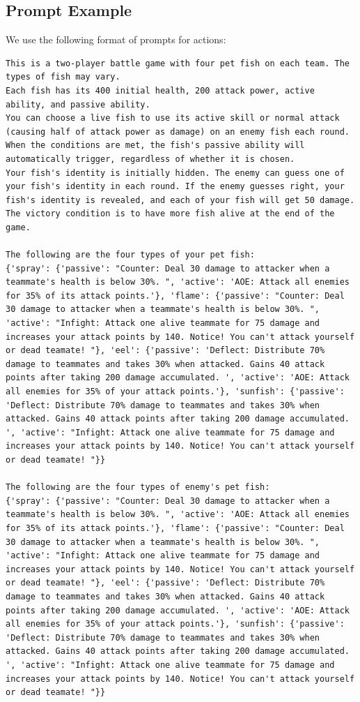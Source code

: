 \subsection{Prompt Example}
We use the following format of prompts for actions:
\begin{lstlisting}
This is a two-player battle game with four pet fish on each team. The types of fish may vary.
Each fish has its 400 initial health, 200 attack power, active ability, and passive ability.
You can choose a live fish to use its active skill or normal attack (causing half of attack power as damage) on an enemy fish each round.
When the conditions are met, the fish's passive ability will automatically trigger, regardless of whether it is chosen.
Your fish's identity is initially hidden. The enemy can guess one of your fish's identity in each round. If the enemy guesses right, your fish's identity is revealed, and each of your fish will get 50 damage.
The victory condition is to have more fish alive at the end of the game.

The following are the four types of your pet fish:
{'spray': {'passive': "Counter: Deal 30 damage to attacker when a teammate's health is below 30%. ", 'active': 'AOE: Attack all enemies for 35% of its attack points.'}, 'flame': {'passive': "Counter: Deal 30 damage to attacker when a teammate's health is below 30%. ", 'active': "Infight: Attack one alive teammate for 75 damage and increases your attack points by 140. Notice! You can't attack yourself or dead teamate! "}, 'eel': {'passive': 'Deflect: Distribute 70% damage to teammates and takes 30% when attacked. Gains 40 attack points after taking 200 damage accumulated. ', 'active': 'AOE: Attack all enemies for 35% of your attack points.'}, 'sunfish': {'passive': 'Deflect: Distribute 70% damage to teammates and takes 30% when attacked. Gains 40 attack points after taking 200 damage accumulated. ', 'active': "Infight: Attack one alive teammate for 75 damage and increases your attack points by 140. Notice! You can't attack yourself or dead teamate! "}}

The following are the four types of enemy's pet fish:
{'spray': {'passive': "Counter: Deal 30 damage to attacker when a teammate's health is below 30%. ", 'active': 'AOE: Attack all enemies for 35% of its attack points.'}, 'flame': {'passive': "Counter: Deal 30 damage to attacker when a teammate's health is below 30%. ", 'active': "Infight: Attack one alive teammate for 75 damage and increases your attack points by 140. Notice! You can't attack yourself or dead teamate! "}, 'eel': {'passive': 'Deflect: Distribute 70% damage to teammates and takes 30% when attacked. Gains 40 attack points after taking 200 damage accumulated. ', 'active': 'AOE: Attack all enemies for 35% of your attack points.'}, 'sunfish': {'passive': 'Deflect: Distribute 70% damage to teammates and takes 30% when attacked. Gains 40 attack points after taking 200 damage accumulated. ', 'active': "Infight: Attack one alive teammate for 75 damage and increases your attack points by 140. Notice! You can't attack yourself or dead teamate! "}}


\end{lstlisting}
